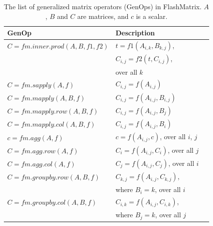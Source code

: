 \begin{table}
\begin{center}
\footnotesize
\begin{tabular}{|l|l|l|}
\hline
GenOp & Description \\
\hline
$C=fm.inner.prod(A, B, f1, f2)$ & $t=f1(A_{i,k}, B_{k,j})$,
\\ & $C_{i,j}=f2(t, C_{i,j})$,
\\ & over all $k$ \\
\hline
$C=fm.sapply(A, f)$ & $C_{i,j}=f(A_{i,j})$ \\
\hline
$C=fm.mapply(A, B, f)$ & $C_{i,j}=f(A_{i,j}, B_{i,j})$ \\
\hline
$C=fm.mapply.row(A, B, f)$ & $C_{i,j}=f(A_{i,j}, B_j)$ \\
\hline
$C=fm.mapply.col(A, B, f)$ & $C_{i,j}=f(A_{i,j}, B_i)$ \\
\hline
$c=fm.agg(A, f)$ & $c=f(A_{i,j}, c)$, over all $i$, $j$ \\
\hline
$C=fm.agg.row(A, f)$ & $C_i=f(A_{i,j}, C_i)$, over all $j$ \\
\hline
$C=fm.agg.col(A, f)$ & $C_j=f(A_{i,j}, C_j)$, over all $i$ \\
\hline
$C=fm.groupby.row(A, B, f)$ & $C_{k,j}=f(A_{i,j}, C_{k,j})$,\\ & where $B_i=k$, over all $i$ \\
\hline
$C=fm.groupby.col(A, B, f)$ & $C_{i,k}=f(A_{i,j}, C_{i,k})$,\\ & where $B_j=k$, over all $j$ \\
\hline
\end{tabular}
\normalsize
\end{center}
\caption{The list of generalized matrix operators (GenOps) in FlashMatrix.
$A$, $B$ and $C$ are matrices, and $c$ is a scalar.}
\label{tbl:genops}
\end{table}

